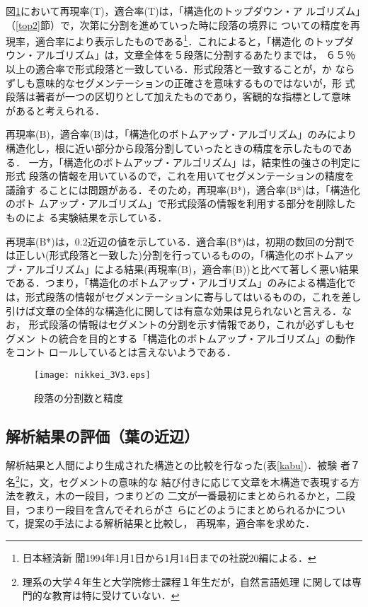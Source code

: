 図\ref{eval1}において再現率(T)，適合率(T)は，「構造化のトップダウン・ア
ルゴリズム」（\ref{top2}節）で，次第に分割を進めていった時に段落の境界に
ついての精度を再現率，適合率により表示したものである\footnote{日本経済新
聞1994年1月1日から1月14日までの社説20編による．}．これによると，「構造化
のトップダウン・アルゴリズム」は，文章全体を５段落に分割するあたりまでは，
６５％以上の適合率で形式段落と一致している．形式段落と一致することが，か
ならずしも意味的なセグメンテーションの正確さを意味するものではないが，形
式段落は著者が一つの区切りとして加えたものであり，客観的な指標として意味
があると考えられる．

再現率(B)，適合率(B)は，「構造化のボトムアップ・アルゴリズム」のみにより
構造化し，根に近い部分から段落分割していったときの精度を示したものである．
一方，「構造化のボトムアップ・アルゴリズム」は，結束性の強さの判定に形式
段落の情報を用いているので，これを用いてセグメンテーションの精度を議論す
ることには問題がある．そのため，再現率(B*)，適合率(B*)は，「構造化のボト
ムアップ・アルゴリズム」で形式段落の情報を利用する部分を削除したものによ
る実験結果を示している．

再現率(B*)は，0.2近辺の値を示している．適合率(B*)は，初期の数回の分割で
は正しい(形式段落と一致した)分割を行っているものの，「構造化のボトムアッ
プ・アルゴリズム」による結果(再現率(B)，適合率(B))と比べて著しく悪い結果
である．つまり，「構造化のボトムアップ・アルゴリズム」のみによる構造化で
は，形式段落の情報がセグメンテーションに寄与してはいるものの，これを差し
引けば文章の全体的な構造化に関しては有意な効果は見られないと言える．なお，
形式段落の情報はセグメントの分割を示す情報であり，これが必ずしもセグメン
トの統合を目的とする「構造化のボトムアップ・アルゴリズム」の動作をコント
ロールしているとは言えないようである．

\begin{figure}
\begin{center}
\texttt{[image: nikkei\_3V3.eps]}
\caption{段落の分割数と精度}\label{eval1}
\end{center}
\end{figure}

\subsection{解析結果の評価（葉の近辺）} \label{sec64}

解析結果と人間により生成された構造との比較を行なった(表\ref{kabu})．被験
者７名\footnote{理系の大学４年生と大学院修士課程１年生だが，自然言語処理
に関しては専門的な教育は特に受けていない．}に，文，セグメントの意味的な
結び付きに応じて文章を木構造で表現する方法を教え，木の一段目，つまりどの
二文が一番最初にまとめられるかと，二段目，つまり一段目を含んでそれらがさ
らにどのようにまとめられるかについて，提案の手法による解析結果と比較し，
再現率，適合率を求めた．

